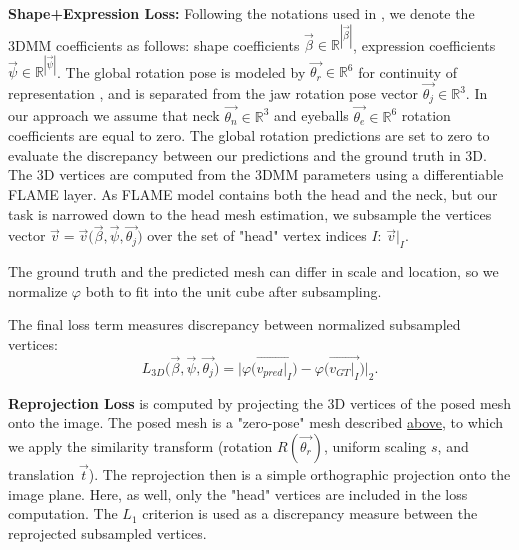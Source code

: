 \documentclass[10pt,twocolumn,letterpaper]{article}
\begin{document}
\textbf{Shape+Expression Loss:}\label{shapeLoss} Following the notations used in \cite{RingNet} , we denote the 3DMM coefficients as follows: shape coefficients $\overrightarrow{\beta}\in\mathbb{R}^{|\overrightarrow{\beta}|}$, expression coefficients $\overrightarrow{\psi}\in\mathbb{R}^{|\overrightarrow{\psi}|}$. 
The global rotation pose is modeled by $\overrightarrow{\theta_{r}}\in\mathbb{R}^{6}$ for continuity of representation \cite{continuity_rotation}, and is separated from the jaw rotation pose vector $\overrightarrow{\theta_{j}}\in\mathbb{R}^{3}$. 
In our approach we assume that neck $\overrightarrow{\theta_{n}}\in\mathbb{R}^{3}$ and eyeballs $\overrightarrow{\theta_{e}}\in\mathbb{R}^{6}$ rotation coefficients are equal to zero.
The global rotation predictions are set to zero to evaluate the discrepancy between our predictions and the ground truth in 3D. 
The 3D vertices are computed from the 3DMM parameters using a differentiable FLAME layer.
As FLAME model \cite{FLAME} contains both the head and the neck, but our task is narrowed down to the head mesh estimation, we subsample the vertices vector $\overrightarrow{v} = \overrightarrow{v}\big(\overrightarrow{\beta}, \overrightarrow{\psi}, \overrightarrow{\theta_{j}}\big)$ over the set of "head" vertex indices $I$: $\overrightarrow{v}|_I$.


The ground truth and the predicted mesh can differ in scale and location, so we normalize $\varphi$
both to fit into the unit cube after subsampling.

The final loss term measures discrepancy between normalized subsampled vertices:\begin{equation} \label{eq424}
L_{3D}\Big(\overrightarrow{\beta}, \overrightarrow{\psi}, \overrightarrow{\theta_{j}}\Big) = \Big|\varphi\Big(\overrightarrow{v_{pred}|_I}\Big) - \varphi\Big(\overrightarrow{v_{GT}|_I}\Big)\Big|_2.
\end{equation}

\textbf{Reprojection Loss} is computed by projecting the 3D vertices of the posed mesh onto the image. 
The posed mesh is a "zero-pose" mesh described \hyperref[shapeLoss]{above}, to which we apply the similarity transform (rotation $R(\overrightarrow{\theta_{r}})$, uniform scaling $s$, and translation $\overrightarrow{t}$). 
The reprojection then is a simple orthographic projection onto the image plane. Here, as well, only the "head" vertices are included in the loss computation. 
The $L_1$ criterion is used as a discrepancy measure between the reprojected subsampled vertices. 
\end{document}
